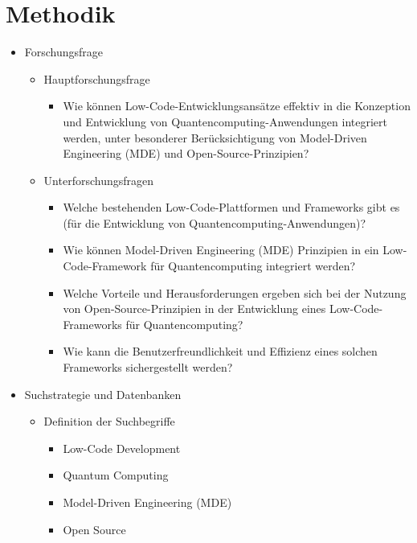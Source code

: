\section{Methodik}
\begin{itemize}
    \item Forschungsfrage
        \begin{itemize}
            \item Hauptforschungsfrage
                \begin{itemize}
                    \item Wie können Low-Code-Entwicklungsansätze effektiv in die Konzeption und Entwicklung von Quantencomputing-Anwendungen integriert werden, unter besonderer Berücksichtigung von Model-Driven Engineering (MDE) und Open-Source-Prinzipien?
                \end{itemize}
            \item Unterforschungsfragen
                \begin{itemize}
                    \item Welche bestehenden Low-Code-Plattformen und Frameworks gibt es (für die Entwicklung von Quantencomputing-Anwendungen)?
                    \item Wie können Model-Driven Engineering (MDE) Prinzipien in ein Low-Code-Framework für Quantencomputing integriert werden?
                    \item Welche Vorteile und Herausforderungen ergeben sich bei der Nutzung von Open-Source-Prinzipien in der Entwicklung eines Low-Code-Frameworks für Quantencomputing?
                    \item Wie kann die Benutzerfreundlichkeit und Effizienz eines solchen Frameworks sichergestellt werden?
                \end{itemize}
        \end{itemize}
    \item Suchstrategie und Datenbanken
        \begin{itemize}
            \item Definition der Suchbegriffe
                \begin{itemize}
                    \item Low-Code Development
                    \item Quantum Computing
                    \item Model-Driven Engineering (MDE)
                    \item Open Source
                \end{itemize}

\end{itemize}
\end{itemize}
